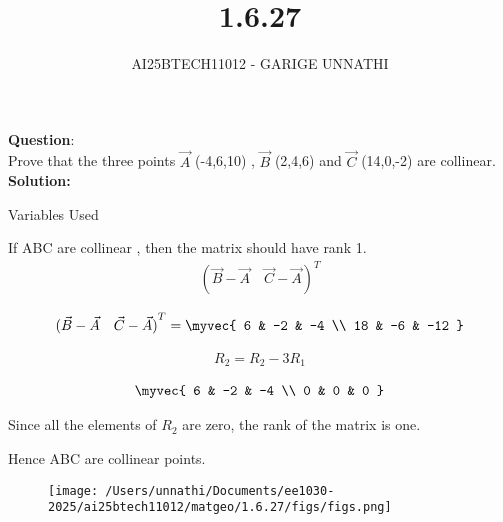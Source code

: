 \documentclass[journal]{IEEEtran}
\begin{document}

\vspace{3cm}

\title{1.6.27}
\author{AI25BTECH11012 - GARIGE UNNATHI}
{\let\newpage\relax\maketitle}


\renewcommand{\thefigure}{\theenumi}
\renewcommand{\thetable}{\theenumi}
\setlength{\intextsep}{10pt} %


\renewcommand{\thetable}{\theenumi}


\textbf{Question}:\\
Prove that the three points $\vec{A}$ (-4,6,10) , $\vec{B}$ (2,4,6) and $\vec{C}$ (14,0,-2) are collinear.
\\
\textbf{Solution: }

 \begin{table}[h!]    
      \centering
      
      \caption{Variables Used}
      \label{}
    \end{table}

 If ABC are collinear , then the matrix should have rank 1.
 \begin{align*}
{(\vec{B} - \vec{A} \quad \vec{C} - \vec{A})}^T
\end{align*}


\begin{align}
    {(\vec{B} - \vec{A} \quad \vec{C} - \vec{A})}^T =  \myvec{
6 & -2 & -4 \\
18 & -6 & -12 
}
\end{align}


\begin{align}
    R_2 = R_2 - 3R_1
\end{align}


\begin{align}
     \myvec{
6 & -2 & -4 \\
0 & 0 & 0 
}
\end{align}

Since all the elements of $R_2$ are zero, the rank of the matrix is one.

Hence ABC are collinear points.

\begin{figure}[h!]
   \centering
   \texttt{[image: /Users/unnathi/Documents/ee1030-2025/ai25btech11012/matgeo/1.6.27/figs/figs.png]}
   \caption{}
   \label{stemplot}
\end{figure}
\end{document}
